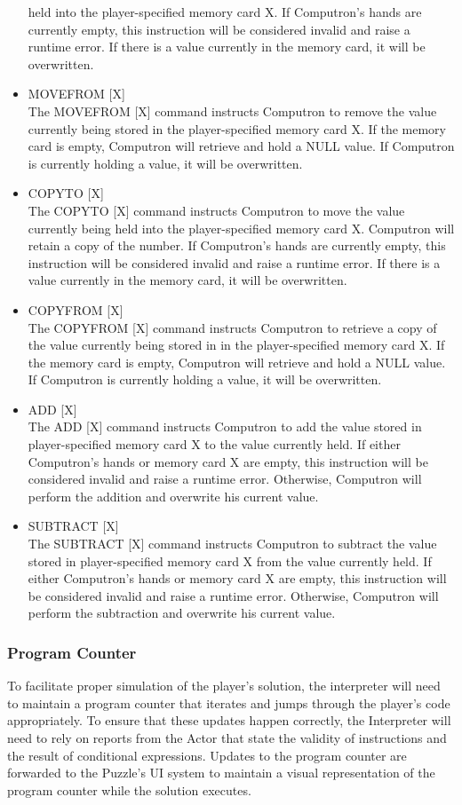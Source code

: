 \begin{itemize}
	held into the player-specified memory card X. If Computron's hands are currently empty, this 
	instruction will be considered invalid and raise a runtime error. If there is a value currently in 
	the memory card, it will be overwritten.
	\item MOVEFROM [X]\\
	The MOVEFROM [X] command instructs Computron to remove the value currently being 
	stored in the player-specified memory card X. If the memory card is empty, Computron will retrieve 
	and hold a NULL value. If Computron is currently holding a value, it will be overwritten.
	\item COPYTO [X]\\
	The COPYTO [X] command instructs Computron to move the value currently being held 
	into the player-specified memory card X. Computron will retain a copy of the number. If 
	Computron's hands are currently empty, this instruction will be considered invalid and raise a 
	runtime error. If there is a value currently in the memory card, it will be overwritten.
	\item COPYFROM [X]\\
	The COPYFROM [X] command instructs Computron to retrieve a copy of the value currently 
	being stored in in the player-specified memory card X. If the memory card is empty, Computron will 
	retrieve and hold a NULL value. If Computron is currently holding a value, it will be overwritten.
	\item ADD [X]\\
	The ADD [X] command instructs Computron to add the value stored in player-specified 
	memory card X to the value currently held. If either Computron's hands or memory card X are empty, this 
	instruction will be considered invalid and raise a runtime error. Otherwise, Computron will 
	perform the addition and overwrite his current value.\\
	\item SUBTRACT [X]\\
	The SUBTRACT [X] command instructs Computron to subtract the value stored in 
	player-specified memory card X from the value currently held. If either Computron's hands or 
	memory card X are empty, this instruction will be considered invalid and raise a runtime error. 
	Otherwise, Computron will perform the subtraction and overwrite his current value.
\end{itemize}

\subsubsection{Program Counter}
To facilitate proper simulation of the player's solution, the interpreter will need to maintain 
a program counter that iterates and jumps through the player's code appropriately. To 
ensure that these updates happen correctly, the Interpreter will need to rely on reports 
from the Actor that state the validity of instructions and the result of conditional expressions.
Updates to the program counter are forwarded to the Puzzle's UI system to maintain a 
visual representation of the program counter while the solution executes.

